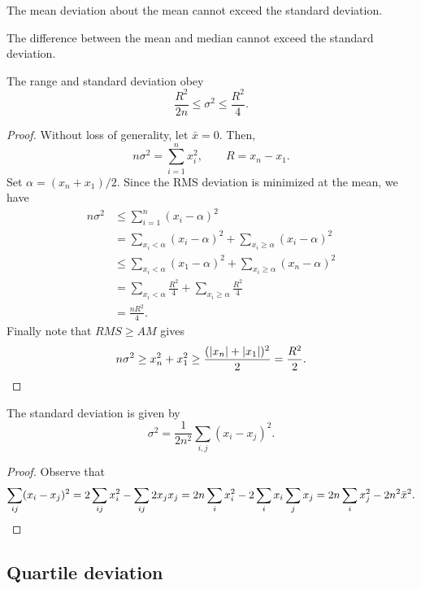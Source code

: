 \documentclass[11pt]{article}
\theoremstyle{definition}
\theoremstyle{remark}
\numberwithin{equation}{section}
\begin{document}
    \begin{theorem}
        The mean deviation about the mean cannot exceed the standard deviation.
    \end{theorem}
    \begin{theorem}
        The difference between the mean and median cannot exceed the standard
        deviation.
    \end{theorem}

    \begin{exercise}
        The range and standard deviation obey \[
            \frac{R^2}{2n} \leq \sigma^2 \leq \frac{R^2}{4}.
        \] 
    \end{exercise}
    \begin{proof}
        Without loss of generality, let $\bar{x} = 0$. Then, \[
            n\sigma^2 = \sum_{i = 1}^n x_i^2, \qquad R = x_n - x_1.
        \] Set $\alpha = (x_n + x_1) / 2$. Since the RMS deviation is minimized at
        the mean, we have \begin{align*}
            n\sigma^2 &\leq \sum_{i = 1}^n (x_i - \alpha)^2 \\
                &= \sum_{x_i < \alpha} (x_i - \alpha)^2 + \sum_{x_i \geq \alpha} (x_i
                - \alpha)^2 \\
                &\leq \sum_{x_i < \alpha} (x_1 - \alpha)^2 + \sum_{x_i \geq \alpha}
                (x_n - \alpha)^2 \\
                &= \sum_{x_i < \alpha} \frac{R^2}{4} + \sum_{x_i \geq \alpha}
                \frac{R^2}{4} \\
                &= \frac{nR^2}{4}.
        \end{align*}
        Finally note that $RMS \geq AM$ gives \[
            n\sigma^2 \geq x_n^2 + x_1^2 \geq \frac{(|x_n| + |x_1|)^2}{2} =
            \frac{R^2}{2}. \qedhere
        \] 
    \end{proof}

    \begin{lemma}
        The standard deviation is given by \[
            \sigma^2 = \frac{1}{2n^2}\sum_{i, j} (x_i - x_j)^2.
        \] 
    \end{lemma}
    \begin{proof}
        Observe that \[
            \sum_{ij} (x_i - x_j)^2 = 2\sum_{ij}x_i^2 - \sum_{ij}2x_jx_j = 2n\sum_i x_i^2
            - 2\sum_i x_i\sum_j x_j = 2n\sum_i x_j^2 - 2n^2\bar{x}^2. \qedhere
        \] 
    \end{proof}
    

    \subsection{Quartile deviation}
    
\end{document}
